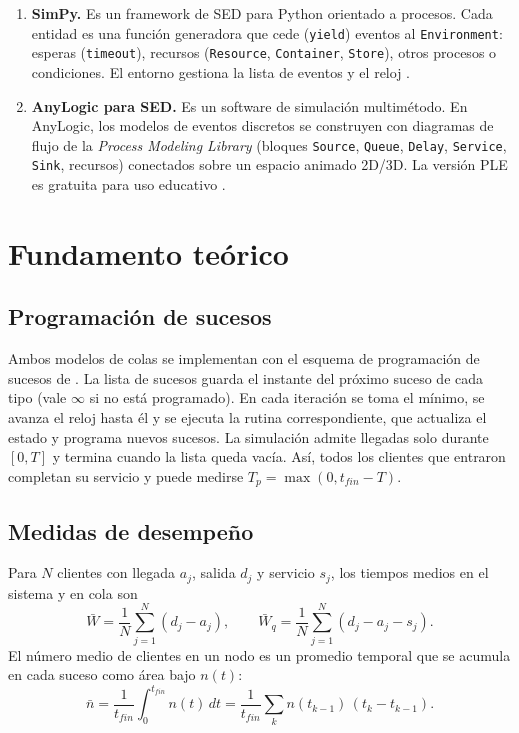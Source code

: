 \documentclass[11pt,a4paper]{article}
\begin{document}
\begin{enumerate}[label=\arabic*.]
 \item \textbf{SimPy.} Es un framework de SED para Python orientado a procesos. Cada
 entidad es una función generadora que cede (\texttt{yield}) eventos al
 \texttt{Environment}: esperas (\texttt{timeout}), recursos (\texttt{Resource},
 \texttt{Container}, \texttt{Store}), otros procesos o condiciones. El entorno gestiona la
 lista de eventos y el reloj \cite{simpydocs,scherfke2014}.
 \item \textbf{AnyLogic para SED.} Es un software de simulación multimétodo. En AnyLogic,
 los modelos de eventos discretos se construyen con diagramas de flujo de la
 \emph{Process Modeling Library} (bloques \texttt{Source}, \texttt{Queue},
 \texttt{Delay}, \texttt{Service}, \texttt{Sink}, recursos) conectados sobre un
 espacio animado 2D/3D. La versión PLE es gratuita para uso educativo \cite{anylogichelp}.
\end{enumerate}

\section{Fundamento teórico}
\subsection{Programación de sucesos}
Ambos modelos de colas se implementan con el esquema de programación de sucesos de
\cite[Sec.~5.4]{rios2008}. La lista de sucesos guarda el instante del próximo suceso de
cada tipo (vale $\infty$ si no está programado). En cada iteración se toma el mínimo, se
avanza el reloj hasta él y se ejecuta la rutina correspondiente, que actualiza el estado y
programa nuevos sucesos. La simulación admite llegadas solo durante $[0,T]$ y termina cuando
la lista queda vacía. Así, todos los clientes que entraron completan su servicio y puede
medirse $T_p=\max(0,t_{fin}-T)$.

\subsection{Medidas de desempeño}
Para $N$ clientes con llegada $a_j$, salida $d_j$ y servicio $s_j$, los tiempos medios en
el sistema y en cola son
\begin{equation}
 \bar W=\frac1N\sum_{j=1}^N(d_j-a_j),\qquad \bar W_q=\frac1N\sum_{j=1}^N(d_j-a_j-s_j).
\end{equation}
El número medio de clientes en un nodo es un promedio temporal que se acumula en cada
suceso como área bajo $n(t)$:
\begin{equation}
 \bar n=\frac{1}{t_{fin}}\int_0^{t_{fin}}n(t)\,dt=\frac{1}{t_{fin}}\sum_k n(t_{k-1})\,(t_k-t_{k-1}).
 \label{eq:area}
\end{equation}
\end{document}
